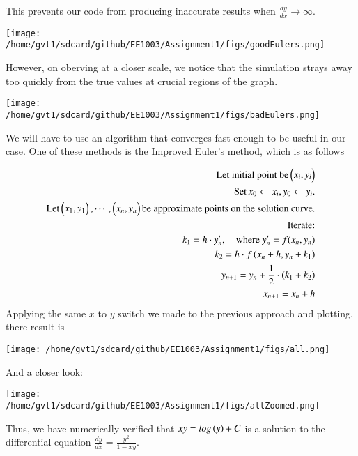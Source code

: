 \documentclass[journal]{IEEEtran}
\begin{document}
This prevents our code from producing inaccurate results when $\frac{dy}{dx} \to \infty$.
\begin{center}
	\texttt{[image: /home/gvt1/sdcard/github/EE1003/Assignment1/figs/goodEulers.png]}  
\end{center}
However, on oberving at a closer scale, we notice that the simulation strays away too quickly from the true values at crucial regions of the graph. 
\begin{center} 
	\texttt{[image: /home/gvt1/sdcard/github/EE1003/Assignment1/figs/badEulers.png]}  
\end{center}
We will have to use an algorithm that converges fast enough to be useful in our case. 
One of these methods is the Improved Euler's method, which is as follows

\begin{align*}
	\text{Let initial point be} \begin{pmatrix}x_i, y_i\end{pmatrix}&\\
	\text{Set}\, x_0 \leftarrow x_i, y_0 \leftarrow y_i. \\\text{Let} \begin{pmatrix}x_1, y_1\end{pmatrix}, \cdots, \begin{pmatrix}x_n, y_n\end{pmatrix} \text{be approximate points on the solution curve.}&\\
	\text{Iterate:} &\\
	k_1 = h \cdot y_n^{\prime}, \quad \text{where } y_n^{\prime} = f(x_n, y_n)& \\
	k_2 = h \cdot f\left(x_n + h, y_n + k_1\right)& \\
	y_{n+1} = y_n + \frac{1}{2} \cdot (k_1 + k_2)& \\
	x_{n+1} = x_n + h&
\end{align*}
Applying the same $x$ to $y$ switch we made to the previous approach and plotting, there result is
\begin{center} 
	\texttt{[image: /home/gvt1/sdcard/github/EE1003/Assignment1/figs/all.png]}  
\end{center}
And a closer look:
\begin{center} 
	\texttt{[image: /home/gvt1/sdcard/github/EE1003/Assignment1/figs/allZoomed.png]}  
\end{center}
Thus, we have numerically verified that $xy = log\left(y\right) + C$ is a solution to the differential equation $\frac{dy}{dx} = \frac{y^2}{1-xy}$.
\end{document}
